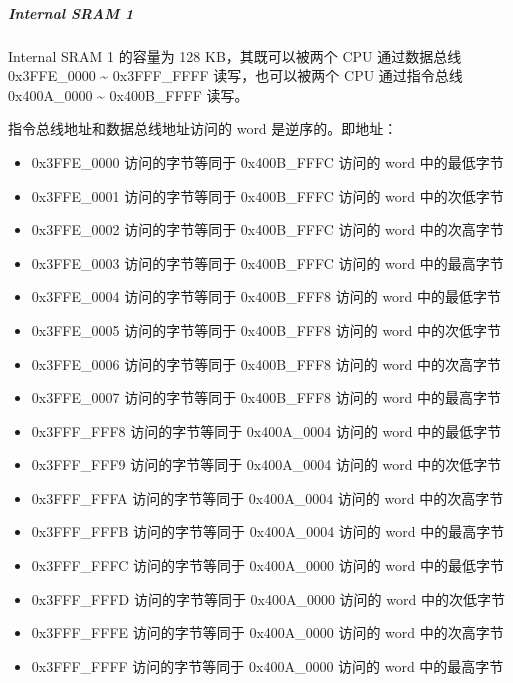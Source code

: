 \documentclass[a4paper,12pt,english]{sphinxmanual}
\begin{document}
\subparagraph{Internal SRAM 1}
\label{\detokenize{dev-board/esp32:internal-sram-1}}
\sphinxAtStartPar
Internal SRAM 1 的容量为 128 KB，其既可以被两个 CPU 通过数据总线 0x3FFE\_0000 \textasciitilde{} 0x3FFF\_FFFF 读写，也可以被两个 CPU 通过指令总线 0x400A\_0000 \textasciitilde{} 0x400B\_FFFF 读写。

\sphinxAtStartPar
指令总线地址和数据总线地址访问的 word 是逆序的。即地址：
\begin{itemize}
\item {} 
\sphinxAtStartPar
0x3FFE\_0000 访问的字节等同于 0x400B\_FFFC 访问的 word 中的最低字节

\item {} 
\sphinxAtStartPar
0x3FFE\_0001 访问的字节等同于 0x400B\_FFFC 访问的 word 中的次低字节

\item {} 
\sphinxAtStartPar
0x3FFE\_0002 访问的字节等同于 0x400B\_FFFC 访问的 word 中的次高字节

\item {} 
\sphinxAtStartPar
0x3FFE\_0003 访问的字节等同于 0x400B\_FFFC 访问的 word 中的最高字节

\item {} 
\sphinxAtStartPar
0x3FFE\_0004 访问的字节等同于 0x400B\_FFF8 访问的 word 中的最低字节

\item {} 
\sphinxAtStartPar
0x3FFE\_0005 访问的字节等同于 0x400B\_FFF8 访问的 word 中的次低字节

\item {} 
\sphinxAtStartPar
0x3FFE\_0006 访问的字节等同于 0x400B\_FFF8 访问的 word 中的次高字节

\item {} 
\sphinxAtStartPar
0x3FFE\_0007 访问的字节等同于 0x400B\_FFF8 访问的 word 中的最高字节

\item {} 
\sphinxAtStartPar
0x3FFF\_FFF8 访问的字节等同于 0x400A\_0004 访问的 word 中的最低字节

\item {} 
\sphinxAtStartPar
0x3FFF\_FFF9 访问的字节等同于 0x400A\_0004 访问的 word 中的次低字节

\item {} 
\sphinxAtStartPar
0x3FFF\_FFFA 访问的字节等同于 0x400A\_0004 访问的 word 中的次高字节

\item {} 
\sphinxAtStartPar
0x3FFF\_FFFB 访问的字节等同于 0x400A\_0004 访问的 word 中的最高字节

\item {} 
\sphinxAtStartPar
0x3FFF\_FFFC 访问的字节等同于 0x400A\_0000 访问的 word 中的最低字节

\item {} 
\sphinxAtStartPar
0x3FFF\_FFFD 访问的字节等同于 0x400A\_0000 访问的 word 中的次低字节

\item {} 
\sphinxAtStartPar
0x3FFF\_FFFE 访问的字节等同于 0x400A\_0000 访问的 word 中的次高字节

\item {} 
\sphinxAtStartPar
0x3FFF\_FFFF 访问的字节等同于 0x400A\_0000 访问的 word 中的最高字节

\end{itemize}
\end{document}
